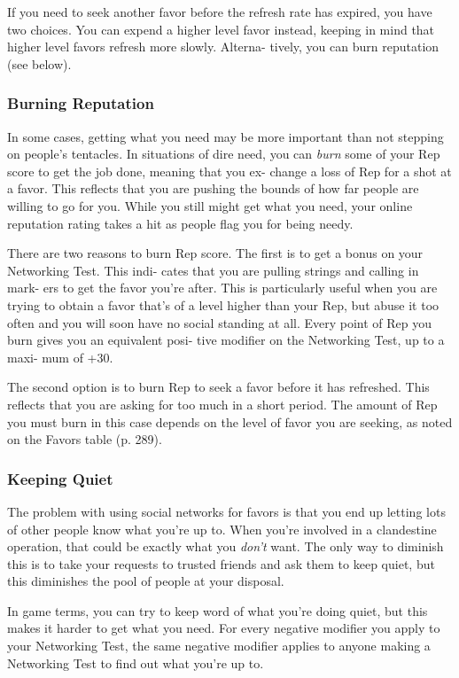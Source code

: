 If you need to seek another favor before the refresh 
rate has expired, you have two choices. You can 
expend a higher level favor instead, keeping in mind 
that higher level favors refresh more slowly. Alterna-
tively, you can burn reputation (see below).

\subsubsection{Burning Reputation}

In some cases, getting what you need may be more 
important than not stepping on people's tentacles. In 
situations of dire need, you can \textit{burn }some of your 
Rep score to get the job done, meaning that you ex-
change a loss of Rep for a shot at a favor. This reflects 
that you are pushing the bounds of how far people are 
willing to go for you. While you still might get what 
you need, your online reputation rating takes a hit as 
people flag you for being needy.

There are two reasons to burn Rep score. The first 
is to get a bonus on your Networking Test. This indi-
cates that you are pulling strings and calling in mark-
ers to get the favor you're after. This is particularly 
useful when you are trying to obtain a favor that's of 
a level higher than your Rep, but abuse it too often 
and you will soon have no social standing at all. Every 
point of Rep you burn gives you an equivalent posi-
tive modifier on the Networking Test, up to a maxi-
mum of +30.

The second option is to burn Rep to seek a favor 
before it has refreshed. This reflects that you are asking 
for too much in a short period. The amount of Rep 
you must burn in this case depends on the level of favor 
you are seeking, as noted on the Favors table (p. 289).

\subsubsection{Keeping Quiet}

The problem with using social networks for favors is 
that you end up letting lots of other people know what 
you're up to. When you're involved in a clandestine 
operation, that could be exactly what you \textit{don't} want. 
The only way to diminish this is to take your requests 
to trusted friends and ask them to keep quiet, but this 
diminishes the pool of people at your disposal.

In game terms, you can try to keep word of what 
you're doing quiet, but this makes it harder to get 
what you need. For every negative modifier you apply 
to your Networking Test, the same negative modifier 
applies to anyone making a Networking Test to find 
out what you're up to.


